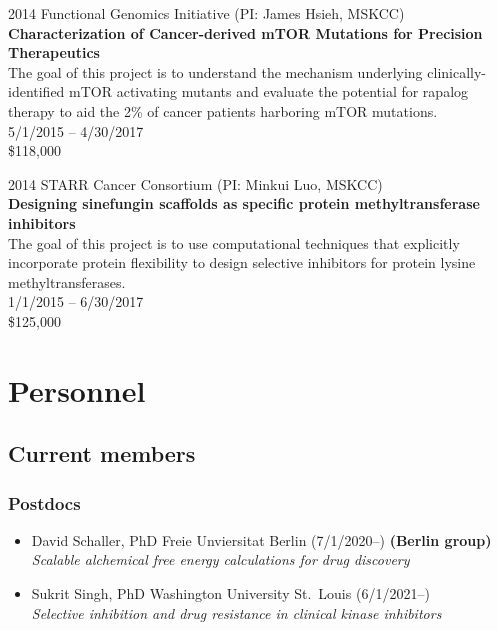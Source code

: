 \documentclass[10pt]{article}
\begin{document}
\vspace{1.5ex}

2014 Functional Genomics Initiative (PI: James Hsieh, MSKCC) \\
{\bf Characterization of Cancer-derived mTOR Mutations for Precision Therapeutics} \\
The goal of this project is to understand the mechanism underlying clinically-identified mTOR activating mutants and evaluate the potential for rapalog therapy to aid the 2\% of cancer patients harboring mTOR mutations. \\
5/1/2015 -- 4/30/2017 \\
\$118,000
\color{black}

\vspace{1.5ex}

2014 STARR Cancer Consortium (PI: Minkui Luo, MSKCC) \\
{\bf Designing sinefungin scaffolds as specific protein methyltransferase inhibitors} \\
The goal of this project is to use computational techniques that explicitly incorporate protein flexibility to design selective inhibitors for protein lysine methyltransferases. \\
1/1/2015 -- 6/30/2017 \\
\$125,000
\color{black}

\eject


\section*{Personnel}

\subsection*{Current members}

\subsubsection*{Postdocs}

\begin{itemize}
  \item David Schaller, PhD Freie Unviersitat Berlin (7/1/2020--) {\bf (Berlin group)}\\
  \emph{Scalable alchemical free energy calculations for drug discovery}

  \item Sukrit Singh, PhD Washington University St.\ Louis (6/1/2021--) \\
  \emph{Selective inhibition and drug resistance in clinical kinase inhibitors}

\end{itemize}
\end{document}
